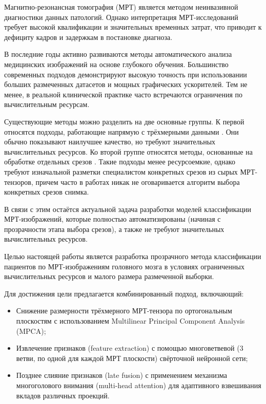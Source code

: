 \documentclass[eqsecnum, authorsinfo]{kioj6}
\begin{document}
Магнитно-резонансная томография (МРТ) является методом неинвазивной диагностики данных патологий. 
Однако интерпретация МРТ-исследований требует высокой квалификации и значительных временных затрат, что приводит к дефициту кадров и задержкам в постановке диагноза.

В последние годы активно развиваются методы автоматического анализа медицинских изображений на основе глубокого обучения. 
Большинство современных подходов демонстрируют высокую точность при использовании больших размеченных датасетов и мощных графических ускорителей. 
Тем не менее, в реальной клинической практике часто встречаются ограничения по вычислительным ресурсам.

Существующие методы можно разделить на две основные группы. К первой относятся подходы, работающие напрямую с трёхмерными данными \cite{3dcnn}. 
Они обычно показывают наилучшее качество, но требуют значительных вычислительных ресурсов. 
Ко второй группе относятся методы, основанные на обработке отдельных срезов \cite{1}. Такие подходы менее ресурсоемкие, однако требуют изначальной разметки специалистом конкретных срезов из сырых МРТ-тензоров, 
причем часто в работах никак не оговаривается алгоритм выбора конкретных срезов снимка.


В связи с этим остаётся актуальной задача разработки моделей классификации МРТ-изображений, которые полностью автоматизированы (начиная с прозрачности этапа выбора срезов), а также
не требуют значительных вычислительных ресурсов.

Целью настоящей работы является разработка прозрачного метода классификации пациентов по МРТ-изображениям головного мозга в условиях ограниченных вычислительных ресурсов и 
малого размера размеченной выборки. 

Для достижения цели предлагается комбинированный подход, включающий:
\begin{itemize}
    \item Снижение размерности трёхмерного МРТ-тензора по ортогональным плоскостям с использованием Multilinear Principal Component Analysis (MPCA);
    \item Извлечение признаков (feature extraction) с помощью многоветвевой (3 ветви, по одной для каждой МРТ плоскости) свёрточной нейронной сети;
    \item Позднее слияние признаков (late fusion) с применением механизма многоголового внимания (multi-head attention) для адаптивного взвешивания вкладов различных проекций.
\end{itemize}
\end{document}
